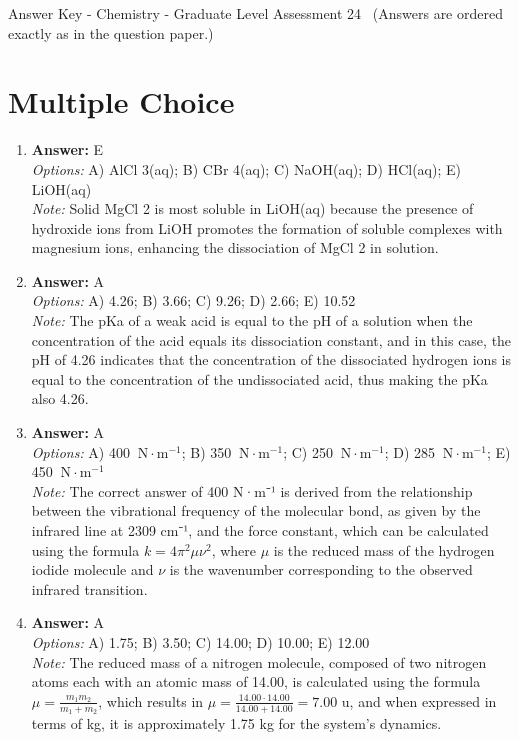 \documentclass[12pt]{article}
\begin{document}
\begin{center}
Answer Key - Chemistry - Graduate Level Assessment 24 \
\small (Answers are ordered exactly as in the question paper.)
\end{center}

\section*{Multiple Choice}
\begin{enumerate}[label=\arabic*.]
\item \textbf{Answer:} E
\\ \textit{Options:} A) AlCl 3(aq); B) CBr 4(aq); C) NaOH(aq); D) HCl(aq); E) LiOH(aq)
\\ \textit{Note:} Solid MgCl 2 is most soluble in LiOH(aq) because the presence of hydroxide ions from LiOH promotes the formation of soluble complexes with magnesium ions, enhancing the dissociation of MgCl 2 in solution.
\item \textbf{Answer:} A
\\ \textit{Options:} A) 4.26; B) 3.66; C) 9.26; D) 2.66; E) 10.52
\\ \textit{Note:} The pKa of a weak acid is equal to the pH of a solution when the concentration of the acid equals its dissociation constant, and in this case, the pH of 4.26 indicates that the concentration of the dissociated hydrogen ions is equal to the concentration of the undissociated acid, thus making the pKa also 4.26.
\item \textbf{Answer:} A
\\ \textit{Options:} A) 400 $ \mathrm{~N} \cdot \mathrm{m}^{-1}$; B) 350 $ \mathrm{~N} \cdot \mathrm{m}^{-1}$; C) 250 $ \mathrm{~N} \cdot \mathrm{m}^{-1}$; D) 285 $\mathrm{~N} \cdot \mathrm{m}^{-1}$; E) 450 $\mathrm{~N} \cdot \mathrm{m}^{-1}$
\\ \textit{Note:} The correct answer of 400 N·m⁻¹ is derived from the relationship between the vibrational frequency of the molecular bond, as given by the infrared line at 2309 cm⁻¹, and the force constant, which can be calculated using the formula \( k = 4\pi^2 \mu \nu^2 \), where \(\mu\) is the reduced mass of the hydrogen iodide molecule and \(\nu\) is the wavenumber corresponding to the observed infrared transition.
\item \textbf{Answer:} A
\\ \textit{Options:} A) 1.75; B) 3.50; C) 14.00; D) 10.00; E) 12.00
\\ \textit{Note:} The reduced mass of a nitrogen molecule, composed of two nitrogen atoms each with an atomic mass of 14.00, is calculated using the formula \( \mu = \frac{m_1 m_2}{m_1 + m_2} \), which results in \( \mu = \frac{14.00 \cdot 14.00}{14.00 + 14.00} = 7.00 \) u, and when expressed in terms of kg, it is approximately 1.75 kg for the system's dynamics.

\end{enumerate}
\end{document}
